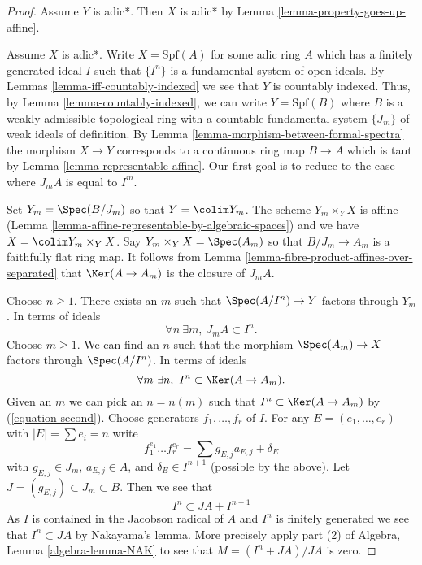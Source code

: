 \begin{proof}
Assume $Y$ is adic*. Then $X$ is adic* by
Lemma \ref{lemma-property-goes-up-affine}.

\medskip\noindent
Assume $X$ is adic*. Write $X = \text{Spf}(A)$ for some adic ring $A$
which has a finitely generated ideal $I$ such that $\{I^n\}$ is a
fundamental system of open ideals. By Lemmas \ref{lemma-iff-countably-indexed}
we see that $Y$ is countably indexed. Thus, by
Lemma \ref{lemma-countably-indexed},
we can write $Y = \text{Spf}(B)$ where $B$ is a weakly admissible
topological ring with a countable fundamental system $\{J_m\}$ of
weak ideals of definition. By Lemma \ref{lemma-morphism-between-formal-spectra}
the morphism $X \to Y$ corresponds to a continuous ring map
$B \to A$ which is taut by Lemma \ref{lemma-representable-affine}.
Our first goal is to reduce to the case where $J_m A$ is equal to $I^m$.

\medskip\noindent
Set $Y_m = \Spec(B/J_m)$ so that
$Y = \colim Y_m$. The scheme $Y_m \times_Y X$ is affine
(Lemma \ref{lemma-affine-representable-by-algebraic-spaces})
and we have $X = \colim Y_m \times_Y X$. Say $Y_m \times_Y X = \Spec(A_m)$
so that $B/J_m \to A_m$ is a faithfully flat ring map.
It follows from Lemma \ref{lemma-fibre-product-affines-over-separated}
that $\Ker(A \to A_m)$ is the closure of $J_mA$.

\medskip\noindent
Choose $n \geq 1$. There exists an $m$ such that $\Spec(A/I^n) \to Y$
factors through $Y_m$. In terms of ideals
\begin{equation}
\label{equation-first}
\forall n\ \exists m,\ J_m A \subset I^n.
\end{equation}
Choose $m \geq 1$. We can find an $n$ such that the morphism
$\Spec(A_m) \to X$ factors through $\Spec(A/I^n)$. In terms of ideals
\begin{equation}
\label{equation-second}
\forall m\ \exists n,\ I^n \subset \Ker(A \to A_m).
\end{equation}
Given an $m$ we can pick an $n = n(m)$ such that
$I^n \subset \Ker(A \to A_m)$ by (\ref{equation-second}).
Choose generators $f_1, \ldots, f_r$ of $I$.
For any $E = (e_1, \ldots, e_r)$ with $|E| = \sum e_i = n$ write
$$
f_1^{e_1} \ldots f_r^{e_r} =
\sum g_{E, j} a_{E, j} + \delta_E
$$
with $g_{E, j} \in J_m$, $a_{E, j} \in A$, and $\delta_E \in I^{n + 1}$
(possible by the above). Let $J = (g_{E, j}) \subset J_m \subset B$.
Then we see that
$$
I^n \subset J A + I^{n + 1}
$$
As $I$ is contained in the Jacobson radical of $A$ and
$I^n$ is finitely generated
we see that $I^n \subset JA$ by Nakayama's lemma. More precisely
apply part (2) of Algebra, Lemma \ref{algebra-lemma-NAK}
to see that $M = (I^n + JA)/JA$ is zero.


\end{proof}
